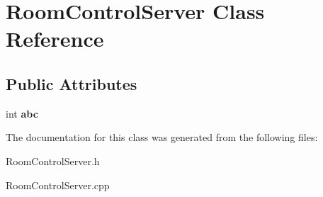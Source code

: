 \hypertarget{classRoomControlServer}{
\section{RoomControlServer Class Reference}
\label{classRoomControlServer}
}
\subsection*{Public Attributes}
\begin{DoxyCompactItemize}
\item 
\hypertarget{classRoomControlServer_ad57e36019c90f4f195a47e341057d3a4}{
int {\bfseries abc}}
\label{classRoomControlServer_ad57e36019c90f4f195a47e341057d3a4}

\end{DoxyCompactItemize}


The documentation for this class was generated from the following files:\begin{DoxyCompactItemize}
\item 
RoomControlServer.h\item 
RoomControlServer.cpp\end{DoxyCompactItemize}
